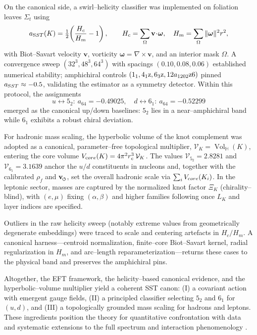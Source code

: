 \documentclass[smallextended]{svjour3}       %
\newcommand{\swirlarrow}{%
	\mathchoice{\mkern-2mu\scriptstyle\boldsymbol{\circlearrowleft}}%
	{\mkern-2mu\scriptstyle\boldsymbol{\circlearrowleft}}%
	{\mkern-2mu\scriptscriptstyle\boldsymbol{\circlearrowleft}}%
	{\mkern-2mu\scriptscriptstyle\boldsymbol{\circlearrowleft}}%
}
\newcommand{\Vol}{\operatorname{Vol}}   %
\newcommand{\rhof}{\rhoF}               %
\newcommand{\vswirl}{\mathbf{v}_{\swirlarrow}}
\newcommand{\rhoF}{\rho_{\!f}}      %
\begin{document}
    On the canonical side, a swirl–helicity classifier was implemented on foliation leaves \(\Sigma_t\) using
    \[
        a_{\textrm SST}(K)=\tfrac12\!\left(\frac{H_c}{H_m}-1\right),\qquad
        H_c=\sum_{\Omega}\mathbf v\!\cdot\!\boldsymbol\omega,\quad
        H_m=\sum_{\Omega}\|\boldsymbol\omega\|^2 r^2,
    \]
    with Biot–Savart velocity \(\mathbf v\), vorticity \(\boldsymbol{\omega}=\nabla\times\mathbf v\), and an interior mask \(\Omega\). A convergence sweep \((32^3,48^3,64^3)\) with spacings \((0.10,0.08,0.06)\) established numerical stability; amphichiral controls \((1_1,4_1{\textrm z},6_3{\textrm z},12a_{1202}\textrm{z6})\) pinned \(a_{\textrm SST}\approx-0.5\), validating the estimator as a symmetry detector. Within this protocol, the assignments
    \[
        u \leftrightarrow 5_2:\ a_{64}=-0.49025,\quad
        d \leftrightarrow 6_1:\ a_{64}=-0.52299
    \]
    emerged as the canonical up/down baselines: \(5_2\) lies in a near–amphichiral band while \(6_1\) exhibits a robust chiral deviation.

    For hadronic mass scaling, the hyperbolic volume of the knot complement was adopted as a canonical, parameter–free topological multiplier,
    \(\mathcal{V}_K=\Vol_{\!\mathbb{H}}(K)\), entering the core volume \(V_{\textrm core}(K)=4\pi^2 r_c^3\,\mathcal{V}_K\).
    The values \(\mathcal{V}_{5_2}=2.8281\) and \(\mathcal{V}_{6_1}=3.1639\) anchor the \(u/d\) constituents in nucleons and, together with the calibrated \(\rhof\) and \(\vswirl\), set the overall hadronic scale via \(\sum_i V_{\textrm core}(K_i)\).
    In the leptonic sector, masses are captured by the normalized knot factor \(\Xi_K\) (chirality–blind), with \((e,\mu)\) fixing \((\alpha,\beta)\) and higher families following once \(L_K\) and layer indices are specified.

    Outliers in the raw helicity sweep (notably extreme values from geometrically degenerate embeddings) were traced to scale and centering artefacts in \(H_c/H_m\). A canonical harness—centroid normalization, finite–core Biot–Savart kernel, radial regularization in \(H_m\), and arc–length reparameterization—returns these cases to the physical band and preserves the amphichiral pins.

    Altogether, the EFT framework, the helicity–based canonical evidence, and the hyperbolic–volume multiplier yield a coherent SST canon: (I) a covariant action with emergent gauge fields, (II) a principled classifier selecting \(5_2\) and \(6_1\) for \((u,d)\), and (III) a topologically grounded mass scaling for hadrons and leptons. These ingredients position the theory for quantitative confrontation with data and systematic extensions to the full spectrum and interaction phenomenology \cite{Barcelo2011,Volovik2003,Faddeev1997,Arnold1998}.
\end{document}
